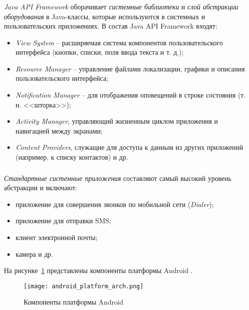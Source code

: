 \subsubsection{}
\label{subsub:android_platform:struct_and_arch:java_api}
\textit{Java API Framework} оборачивает \textit{системные библиотеки} и \textit{слой абстракции оборудования} в Java-классы, которые используются в системных и пользовательских приложениях. В состав Java API Framework входят:
\begin{itemize}
	\item \textit{View System} -- расширяемая система компонентов пользовательского интерфейса (кнопки, списки, поля ввода текста и т. д.);
	\item \textit{Resource Manager} -- управление файлами локализации, графики и описания пользовательского интерфейса;
	\item \textit{Notification Manager} -- для отображения оповещений в строке состояния (т. н. <<шторка>>);
	\item \textit{Activity Manager}, управляющий жизненным циклом приложения и навигацией между экранами;
	\item \textit{Content Providers}, служащие для доступа к данным из других приложений (например, к списку контактов) и др.
\end{itemize}

\subsubsection{}
\label{subsub:android_platform:struct_and_arch:system_apps}
\textit{Стандартные системные приложения} составляют самый высокий уровень абстракции и включают:
\begin{itemize}
	\item приложение для совершения звонков по мобильной сети (\textit{Dialer});
	\item приложение для отправки SMS;
	\item клиент электронной почты;
	\item камера и др.
\end{itemize}

На рисунке~\ref{fig:android_platform_arch} представлены компоненты платформы Android \cite{android_platform_arch}.

\begin{figure}[p]
    \centering
    \texttt{[image: android\_platform\_arch.png]}  
    \caption{Компоненты платформы Android}
	\label{fig:android_platform_arch}
\end{figure}

